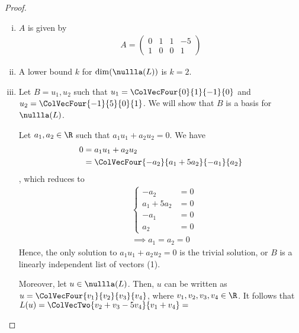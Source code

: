 \begin{proof}
    \begin{enumerate}[(i)]
        \item $A$ is given by 
        \[
            \begin{aligned}
                A = \begin{pmatrix}
                    0 & 1 & 1 & -5\\
                    1 & 0 & 0 & 1
                \end{pmatrix}
            \end{aligned}
        \]
        \item A lower bound $k$ for $\dim(\nullla(L))$ is $k=2$.
        \item Let $B=u_1,u_2$ such that $u_1=\ColVecFour{0}{1}{-1}{0}$ and $u_2=\ColVecFour{-1}{5}{0}{1}$.
        We will show that $B$ is a basis for $\nullla(L)$.
        
        Let $a_1,a_2\in\R$ such that $a_1u_1+a_2u_2=0$. We have 
        \[
            \begin{aligned}
                0
                &= a_1u_1+a_2u_2\\
                &= \ColVecFour{-a_2}{a_1+5a_2}{-a_1}{a_2}
            \end{aligned}
        \]
        , which reduces to
        \begin{align*}
            &\begin{cases}
                -a_2&=0\\
                a_1+5a_2&=0\\
                -a_1&=0\\
                a_2&=0
            \end{cases}\\&\implies
            a_1=a_2=0
        \end{align*}
        Hence, the only solution to $a_1u_1+a_2u_2=0$ is the trivial solution, or $B$ is a linearly independent list of vectors (1).
        
        Moreover, let $u\in\nullla(L)$. Then, $u$ can be written as $u=\ColVecFour{v_1}{v_2}{v_3}{v_4}$, where $v_1,v_2,v_3,v_4\in\R$.
        It follows that $L(u)=\ColVecTwo{v_2+v_3-5v_4}{v_1+v_4}=$ 
    \end{enumerate}
    
\end{proof}